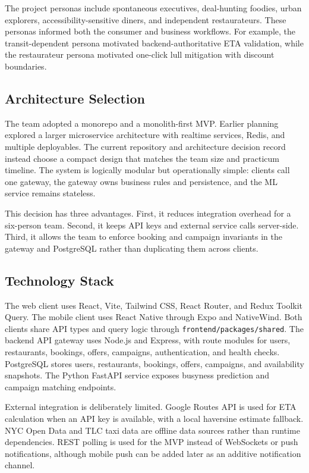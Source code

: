 \documentclass[conference]{IEEEtran}
\begin{document}
The project personas include spontaneous executives, deal-hunting foodies, urban explorers, accessibility-sensitive diners, and independent restaurateurs. These personas informed both the consumer and business workflows. For example, the transit-dependent persona motivated backend-authoritative ETA validation, while the restaurateur persona motivated one-click lull mitigation with discount boundaries.

\subsection{Architecture Selection}
The team adopted a monorepo and a monolith-first MVP. Earlier planning explored a larger microservice architecture with realtime services, Redis, and multiple deployables. The current repository and architecture decision record instead choose a compact design that matches the team size and practicum timeline. The system is logically modular but operationally simple: clients call one gateway, the gateway owns business rules and persistence, and the ML service remains stateless.

This decision has three advantages. First, it reduces integration overhead for a six-person team. Second, it keeps API keys and external service calls server-side. Third, it allows the team to enforce booking and campaign invariants in the gateway and PostgreSQL rather than duplicating them across clients.

\subsection{Technology Stack}
The web client uses React, Vite, Tailwind CSS, React Router, and Redux Toolkit Query. The mobile client uses React Native through Expo and NativeWind. Both clients share API types and query logic through \texttt{frontend/packages/shared}. The backend API gateway uses Node.js and Express, with route modules for users, restaurants, bookings, offers, campaigns, authentication, and health checks. PostgreSQL stores users, restaurants, bookings, offers, campaigns, and availability snapshots. The Python FastAPI service exposes busyness prediction and campaign matching endpoints.

External integration is deliberately limited. Google Routes API is used for ETA calculation when an API key is available, with a local haversine estimate fallback. NYC Open Data and TLC taxi data are offline data sources rather than runtime dependencies. REST polling is used for the MVP instead of WebSockets or push notifications, although mobile push can be added later as an additive notification channel.
\end{document}
